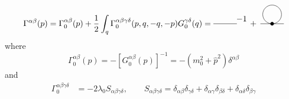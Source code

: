 \begin{equation}
\Gamma^{\alpha \beta}(p)=\Gamma_{0}^{\alpha \beta}(p)+\frac{1}{2} \int_{q} \Gamma_{0}^{\alpha \beta \gamma \delta}(p, q,-q,-p) G_{0}^{\gamma \delta}(q) = 
\begin{tikzpicture}[baseline=2ex]
           \draw (0,0.4) -- (1,0.4);
           \node at (1.2,0.6) {$-1$};
           \node at (1.7,0.4) {$+$};
           \draw (2,0.4) -- (3,0.4);
           \filldraw[black] (2.5,0.4) circle (2pt);
           \draw (2.5,0.8) circle (0.4);
       \end{tikzpicture}
\end{equation}
where
\begin{equation}
\Gamma_{0}^{\alpha \beta}(p)=-\left[G_{0}^{\alpha \beta}(p)\right]^{-1}=-\left(m_{0}^{2}+\hat{p}^{2}\right) \delta^{\alpha \beta}
\end{equation}
and
\begin{align}
\Gamma_{0}^{\alpha \beta \gamma{\delta}} & =-2 \lambda_{0} S_{\alpha \beta{\gamma} \delta}, \qquad S_{\alpha \beta \gamma  \delta}=\delta_{\alpha \beta} \delta_{\gamma \delta}+\delta_{\alpha \gamma} \delta_{\beta \delta}+\delta_{\alpha \delta} \delta_{\beta \gamma} 
\end{align}


